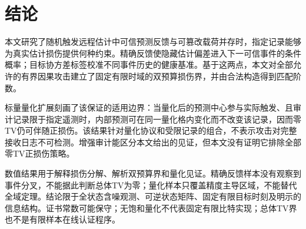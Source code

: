 \section{结论}
本文研究了随机触发远程估计中可信预测反馈与可篡改载荷并存时，指定记录能够为真实估计损伤提供何种约束。精确反馈使隐藏估计偏差进入下一可信事件的条件概率；目标协方差标签校准不同事件历史的健康基准。基于这两点，本文对全部允许的有界因果攻击建立了固定有限时域的双预算损伤界，并由合法构造得到匹配阶数。

标量量化扩展刻画了该保证的适用边界：当量化后的预测中心参与实际触发、且审计记录限于指定遥测时，内部预测可在同一量化格内变化而不改变该记录，因而零TV仍可伴随正损伤。该结果针对量化协议和受限记录的组合，不表示攻击对完整接收日志不可检测。增强审计能区分本文给出的见证，但本文没有证明它排除全部零TV正损伤策略。

数值结果用于解释损伤分解、解析双预算界和量化见证。精确反馈样本没有观察到事件分叉，不能据此判断总体TV为零；量化样本只覆盖精度主导区域，不能替代全域定理。结论限于全状态含噪观测、可逆状态矩阵、固定有限目标时刻及明示的信息结构。证书常数可能保守；无饱和量化不代表固定有限比特实现；总体TV界也不是有限样本在线认证程序。

